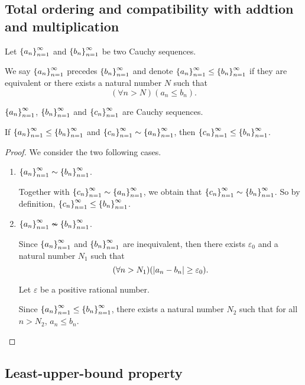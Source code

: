 \subsection{Total ordering and compatibility with addtion and multiplication}

\begin{definition}
    Let $\seq{a_{n}}$ and $\seq{b_{n}}$ be two Cauchy sequences.

    We say $\seq{a_{n}}$ precedes $\seq{b_{n}}$ and denote $\seq{a_{n}}\le\seq{b_{n}}$ if they are equivalent or there exists a natural number $N$ such that
    \[
        (\forall n > N)(a_{n}\le b_{n}).
    \]
\end{definition}

\begin{theorem}
    $\seq{a_{n}}$, $\seq{b_{n}}$ and $\seq{c_{n}}$ are Cauchy sequences.

    If $\seq{a_{n}}\le\seq{b_{n}}$ and $\seq{c_{n}}\sim\seq{a_{n}}$, then $\seq{c_{n}}\le\seq{b_{n}}$.
\end{theorem}

\begin{proof}
    We consider the two following cases.

    \begin{enumerate}[label={\textbf{Case \arabic*.}},itemsep=0pt,topsep=0pt]
        \item $\seq{a_{n}}\sim\seq{b_{n}}$.

              Together with $\seq{c_{n}}\sim\seq{a_{n}}$, we obtain that $\seq{c_{n}}\sim\seq{b_{n}}$. So by definition, $\seq{c_{n}}\le\seq{b_{n}}$.
        \item $\seq{a_{n}}\nsim\seq{b_{n}}$.

              Since $\seq{a_{n}}$ and $\seq{b_{n}}$ are inequivalent, then there exists $\varepsilon_{0}$ and a natural number $N_{1}$ such that
              \[
                  (\forall n > N_{1})(\abs{a_{n} - b_{n}}\ge\varepsilon_{0}).
              \]

              Let $\varepsilon$ be a positive rational number.

              Since $\seq{a_{n}}\le\seq{b_{n}}$, there exists a natural number $N_{2}$ such that for all $n > N_{2}$, $a_{n}\le b_{n}$.
    \end{enumerate}
\end{proof}

\subsection{Least-upper-bound property}

